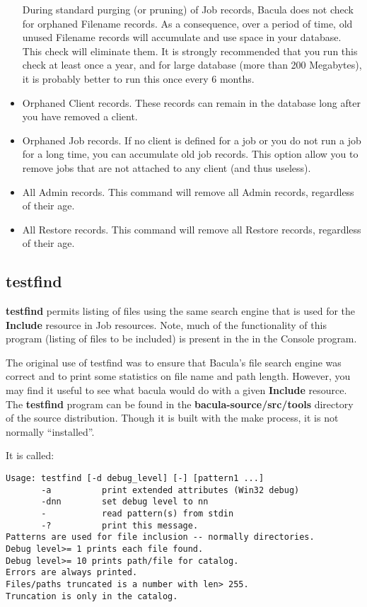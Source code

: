 \begin{itemize}
During standard purging (or pruning) of Job records, Bacula does  not check
for orphaned Filename records. As a consequence, over a period  of time, old
unused Filename records will accumulate and use  space in your database. This
check will eliminate them. It is strongly  recommended that you run this check
at least once a year, and for  large database (more than 200 Megabytes), it is
probably better to  run this once every 6 months.  
\item Orphaned Client records. These records can remain in the database  long
   after you have removed a client. 
\item Orphaned Job records. If no client is defined for a job or you  do not
   run a job for a long time, you can accumulate old job  records. This option
   allow you to remove jobs that are not  attached to any client (and thus
useless).  
\item All Admin records. This command will remove all Admin records, 
   regardless of their age.  
\item All Restore records. This command will remove all Restore records, 
   regardless of their age. 
   \end{itemize}

\subsection*{testfind}
\label{testfind}

{\bf testfind} permits listing of files using the same search engine that is
used for the {\bf Include} resource in Job resources. Note, much of the
functionality of this program (listing of files to be included) is present in
the 
 in the Console program. 

The original use of testfind was to ensure that Bacula's file search engine
was correct and to print some statistics on file name and path length.
However, you may find it useful to see what bacula would do with a given {\bf
Include} resource. The {\bf testfind} program can be found in the {\bf
\lt{}bacula-source\gt{}/src/tools} directory of the source distribution.
Though it is built with the make process, it is not normally ``installed''. 

It is called: 

\footnotesize
\begin{verbatim}
Usage: testfind [-d debug_level] [-] [pattern1 ...]
       -a          print extended attributes (Win32 debug)
       -dnn        set debug level to nn
       -           read pattern(s) from stdin
       -?          print this message.
Patterns are used for file inclusion -- normally directories.
Debug level>= 1 prints each file found.
Debug level>= 10 prints path/file for catalog.
Errors are always printed.
Files/paths truncated is a number with len> 255.
Truncation is only in the catalog.
\end{verbatim}
\normalsize

